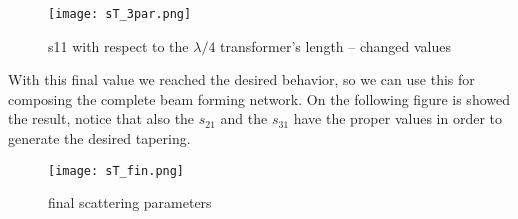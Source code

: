 \begin{figure}[H]
	\centering
	\texttt{[image: sT\_3par.png]}
	\caption{s11 with respect to the $\lambda/4$ transformer's length -- changed values}
	\label{sT_3par}
\end{figure}
With this final value we reached the desired behavior, so we can use this for composing the complete beam forming network. On the following figure is showed the result, notice that also the $s_{21}$ and the $s_{31}$ have the proper values in order to generate the desired tapering.
\begin{figure}[H]
	\centering
	\texttt{[image: sT\_fin.png]}
	\caption{final scattering parameters}
	\label{sT_fin}
\end{figure}
